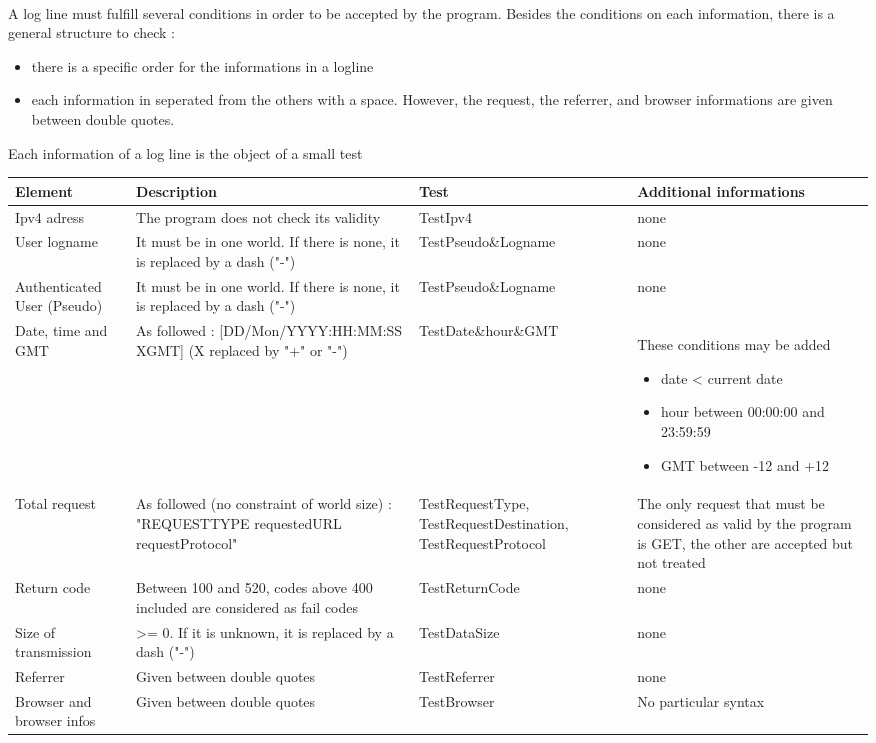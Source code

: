 \documentclass[a4paper, 12pts]{article}
\begin{document}
\paragraph{}
 A log line must fulfill several conditions in order to be accepted by the program. Besides the conditions on each information, there is a general structure to check :
 \begin{itemize}[label=$\square$]
 \item there is a specific order for the informations in a logline
 \item each information in seperated from the others with a space. However, the request, the referrer, and browser informations are given between double quotes.
 \end{itemize}
 Each information of a log line is the object of a small test
 \begin{center}
   \begin{tabular}{| p{2.5cm} | p{4.5cm} | p{3.3cm} | p{3.5cm} |}
     \hline
     Element & Description & Test & Additional informations\\ \hline
     Ipv4 adress & The program does not check its validity & TestIpv4 & none\\ \hline
     User logname & It must be in one world. If there is none, it is replaced by a dash ("-") & TestPseudo\&Logname & none\\ \hline
     Authenticated User (Pseudo) & It must be in one world. If there is none, it is replaced by a dash ("-") & TestPseudo\&Logname & none\\ \hline
     Date, time and GMT &  As followed : [DD/Mon/YYYY:HH:MM:SS XGMT] (X replaced by "+" or "-") & TestDate\&hour\&GMT & These conditions may be added
 \begin{itemize}
 \item date < current date
 \item hour between 00:00:00 and 23:59:59
 \item GMT between -12 and +12
 \end{itemize}\\ \hline
     Total request & As followed (no constraint of world size) : "REQUESTTYPE requestedURL requestProtocol" & TestRequestType, TestRequestDestination, TestRequestProtocol & The only request that must be considered as valid by the program is GET, the other are accepted but not treated\\ \hline
     Return code & Between 100 and 520, codes above 400 included are considered as fail codes & TestReturnCode & none\\ \hline
     Size of transmission & >= 0. If it is unknown, it is replaced by a dash ("-") & TestDataSize & none\\ \hline
     Referrer & Given between double quotes & TestReferrer & none\\ \hline
     Browser and browser infos & Given between double quotes & TestBrowser & No particular syntax \\
     \hline
   \end{tabular}
 \end{center}
\end{document}

